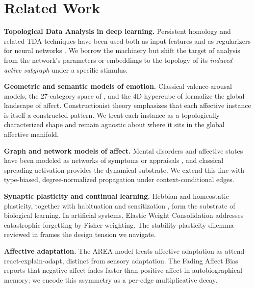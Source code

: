 \documentclass{article}
\begin{document}
\section{Related Work}
\textbf{Topological Data Analysis in deep learning.} Persistent homology and
related TDA techniques have been used both as input features and as
regularizers for neural networks
\cite{bubenik2015statistical, zeng2024neural, hofer2017deep}. We borrow the
machinery but shift the target of analysis from the network's parameters or
embeddings to the topology of its \emph{induced active subgraph} under a
specific stimulus.

\textbf{Geometric and semantic models of emotion.} Classical valence-arousal
models, the 27-category space of \cite{cowen2017self}, and the 4D hypercube
of \cite{fontaine2016modeling} formalize the global landscape of affect.
Constructionist theory \cite{barrett2017theory, barrett2025more} emphasizes
that each affective instance is itself a constructed pattern. We treat each
instance as a topologically characterized shape and remain agnostic about
where it sits in the global affective manifold.

\textbf{Graph and network models of affect.} Mental disorders and affective
states have been modeled as networks of symptoms or appraisals
\cite{borsboom2017network, bringmann2016temporal}, and classical spreading
activation \cite{collins1975spreading} provides the dynamical substrate. We
extend this line with type-biased, degree-normalized propagation under
context-conditional edges.

\textbf{Synaptic plasticity and continual learning.} Hebbian
\cite{hebb1949organization} and homeostatic \cite{turrigiano2008homeostatic}
plasticity, together with habituation \cite{thompson1966habituation} and
sensitization \cite{groves1970habituation}, form the substrate of biological
learning. In artificial systems, Elastic Weight Consolidation
\cite{kirkpatrick2017overcoming} addresses catastrophic forgetting by Fisher
weighting. The stability-plasticity dilemma reviewed in
\cite{vandeven2024continual} frames the design tension we navigate.

\textbf{Affective adaptation.} The AREA model
\cite{wilson2008explaining} treats affective adaptation as
attend-react-explain-adapt, distinct from sensory adaptation. The Fading
Affect Bias \cite{walker2009fab, frontpsychol2025fab} reports that negative
affect fades faster than positive affect in autobiographical memory; we
encode this asymmetry as a per-edge multiplicative decay.
\end{document}
